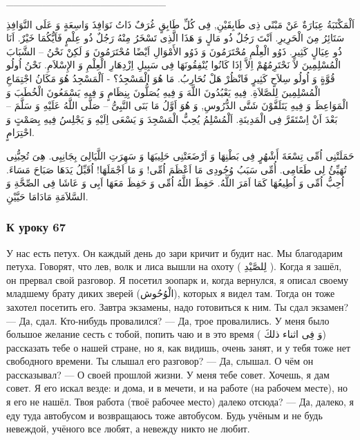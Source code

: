 \documentclass[a5paper]{article}
\begin{document}
\_\_\_\_\_\_\_\_\_\_\_\_\_\_\_\_\_\_\_\_\_\_

اَلْمَكْتَبَةُ عِبَارَةٌ عَنْ مَبْنًى ذِى طَابِقَيْنِ, فِى كُلِّ طَابِقٍ غُرَفٌ ذَاتُ نَوَافِذَ وَاسِعَةٍ وَ عَلَى النَّوَافِذِ سَتَائِرُ مِنَ الْحَرِيرِ. اَنْتَ رَجُلٌ ذُو مَالٍ وَ هَذَا الَّذِى تَسْخَرُ مِنْهُ رَجُلٌ ذُو عِلْمٍ فَاَيُّكُمَا خَيْرٌ. اَنَا ذُو عِيَالٍ كَثِيرٍ. ذَوُو الْعِلْمِ مُحْتَرَمُونَ وَ ذَوُو الأَمْوَالِ اَيْضًا مُحْتَرَمُونَ وَ لَكِنْ نَحْنُ – الشَّبَابَ الْمُسْلِمِينَ لاَ نَحْتَرِمُهُمْ اِلاَّ اِذَا كَانُوا يُنْفِقُونَهَا فِى سَبِيلِ اِزْدِهَارِ الْعِلْمِ وَ الإِسْلاَمِ. نَحْنُ اُولُو قُوَّةٍ وَ اُولُو سِلاَحٍ كَثِيرٍ فَانْظُرْ هَلْ نُحَارِبُ. مَا هُوَ الْمَسْجِدُ؟ - اَلْمَسْجِدُ هُوَ مَكَانُ اجْتِمَاعِ الْمُسْلِمِينَ لِلصَّلاَةِ. فِيهِ يَعْبُدُونَ اللَّهَ وَ فِيهِ يُصَلُّونَ بِنِظَامٍ وَ فِيهِ يَسْمَعُونَ الْخُطَبَ وَ الْمَوَاعِظَ وَ فِيهِ يَتَلَقَّوْنَ شَتَّى الدُّرُوسِ, وَ هُوَ اَوَّلُ مَا بَنَى النَّبِىُّ – صَلَّى اللَّهُ عَلَيْهِ وَ سَلَّمَ – بَعْدَ اَنْ اِسْتَقَرَّ فِى الْمَدِينَةِ. اَلْمُسْلِمُ يُحِبُّ الْمَسْجِدَ وَ يَسْعَى اِلَيْهِ وَ يَجْلِسُ فِيهِ بِصَمْتٍ وَ احْتِرَامٍ.

حَمَلَتْنِى اُمِّى تِسْعَةَ أَشْهُرٍ فِى بَطْنِهَا وَ اَرْضَعَتْنِى حَلِيبَهَا وَ سَهِرَتِ اللَّيَالِىَ بِجَانِبِى. هِىَ تُحِبُّنِى تُهَيِّئُ لِى طَعَامِى. أُمِّى سَبَبُ وُجُودِى مَا اَعْظَمَ اُمِّى! وَ مَا اَجْمَلَهَا! اُقَبِّلُ يَدَهَا صَبَاحَ مَسَاءَ. اُحِبُّ اُمِّى وَ اُطِيعُهَا كَمَا اَمَرَ اللَّهُ. حَفِظَ اللَّهُ اُمِّى وَ حَفِظَ مَعَهَا اَبِى وَ عَاشَا فِى الصِّحَّةِ وَ السَّلاَمَةِ مَادَامَا حَيَّيْنِ. 

\subsubsection{К уроку 67}
У нас есть петух. Он каждый день до зари кричит и будит нас. Мы благодарим петуха. Говорят, что лев, волк и лиса вышли на охоту ( لِلصَّيْدِ ). Когда я зашёл, он прервал свой разговор. Я посетил зоопарк и, когда вернулся, я описал своему младшему брату диких зверей (الْوُحُوش), которых я видел там. Тогда он тоже захотел посетить его. Завтра экзамены, надо готовиться к ним. Ты сдал экзамен? — Да, сдал. Кто-нибудь провалился? — Да, трое провалились. У меня было большое желание сесть с тобой, попить чаю и в это время ( وَ فِى اثناء ذلكَ) рассказать тебе о нашей стране, но я, как видишь, очень занят, и у тебя тоже нет свободного времени. Ты слышал его разговор? — Да, слышал. О чём он рассказывал? — О своей прошлой жизни. У меня тебе совет. Хочешь, я дам совет. Я его искал везде: и дома, и в мечети, и на работе (на рабочем месте), но я его не нашёл. Твоя работа (твоё рабочее место) далеко отсюда? — Да, далеко, я еду туда автобусом и возвращаюсь тоже автобусом. Будь учёным и не будь невеждой, учёного все любят, а невежду никто не любит.
\end{document}
